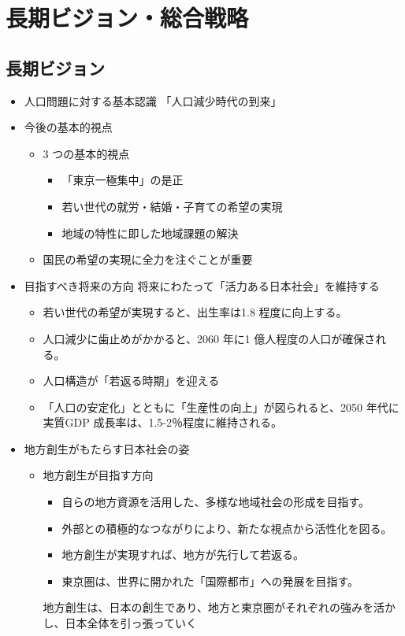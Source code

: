 \section {長期ビジョン・総合戦略}
\subsection {長期ビジョン}
\begin {itemize}
\item 人口問題に対する基本認識
  「人口減少時代の到来」
\item 今後の基本的視点
  \begin {itemize}
  \item 3 つの基本的視点
    \begin {itemize}
    \item 「東京一極集中」の是正
    \item 若い世代の就労・結婚・子育ての希望の実現
    \item 地域の特性に即した地域課題の解決
    \end {itemize}
  \item 国民の希望の実現に全力を注ぐことが重要
  \end {itemize}
\item 目指すべき将来の方向
  将来にわたって「活力ある日本社会」を維持する
  \begin {itemize}
  \item 若い世代の希望が実現すると、出生率は1.8 程度に向上する。
  \item 人口減少に歯止めがかかると、2060 年に1 億人程度の人口が確保される。
  \item 人口構造が「若返る時期」を迎える
  \item 「人口の安定化」とともに「生産性の向上」が図られると、2050 年代に実質GDP 成長率は、1.5-2％程度に維持される。
  \end {itemize}
\item 地方創生がもたらす日本社会の姿
  \begin {itemize}
  \item 地方創生が目指す方向
    \begin {itemize}
    \item 自らの地方資源を活用した、多様な地域社会の形成を目指す。
    \item 外部との積極的なつながりにより、新たな視点から活性化を図る。
    \item 地方創生が実現すれば、地方が先行して若返る。
    \item 東京圏は、世界に開かれた「国際都市」への発展を目指す。
    \end {itemize}
    地方創生は、日本の創生であり、地方と東京圏がそれぞれの強みを活かし、日本全体を引っ張っていく
  \end {itemize}
\end {itemize}


